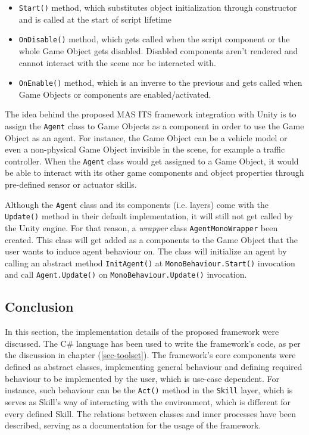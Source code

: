 \documentclass[main.tex]{subfiles}
\begin{document}
\begin{itemize}
    \item \texttt{Start()} method, which substitutes object initialization 
through constructor and is called at the start of script lifetime
    \item \texttt{OnDisable()} method, which gets called when the script component or the whole Game Object 
    gets disabled. Disabled components aren't rendered and cannot interact with the scene nor be interacted 
    with. 
    \item \texttt{OnEnable()} method, which is an inverse to the previous and gets called when Game Objects 
    or components are enabled/activated.
\end{itemize}

The idea behind the proposed MAS ITS framework integration with Unity is to assign the \texttt{Agent} 
class to Game Objects as a component in order to use the Game Object as an agent. For instance, the Game Object can be 
a vehicle model or even a non-physical Game Object invisible in the scene, for example a traffic controller. When 
the \texttt{Agent} class would get assigned to a Game Object, it would be able to interact with its other game
components and object properties through pre-defined sensor or actuator skills. 

Although the \texttt{Agent} class and its components (i.e. layers) come with the \texttt{Update()} method in 
their default implementation, it will still not get called by the Unity engine. For that reason, a \emph{wrapper}
class \texttt{AgentMonoWrapper} been created. This class will get added as a components to the Game Object that 
the user wants to induce agent behaviour on. The class will initialize an agent by calling an abstract method 
\texttt{InitAgent()} at \texttt{MonoBehaviour.Start()} invocation and call \texttt{Agent.Update()} on 
\texttt{MonoBehaviour.Update()} invocation. 

\subsection{Conclusion}

In this section, the implementation details of the proposed framework were discussed. The C\# language has been 
used to write the framework's code, as per the discussion in chapter (\ref{sec-toolset}). The framework's core 
components were defined as abstract classes, implementing general behaviour and defining required behaviour to 
be implemented by the user, which is use-case dependent. For instance, such behaviour can be the \texttt{Act()}
method in the \texttt{Skill} layer, which is serves as Skill's way of interacting with the environment, which is 
different for every defined Skill. The relations between classes and inner processes have been described, serving 
as a documentation for the usage of the framework. 
\end{document}
